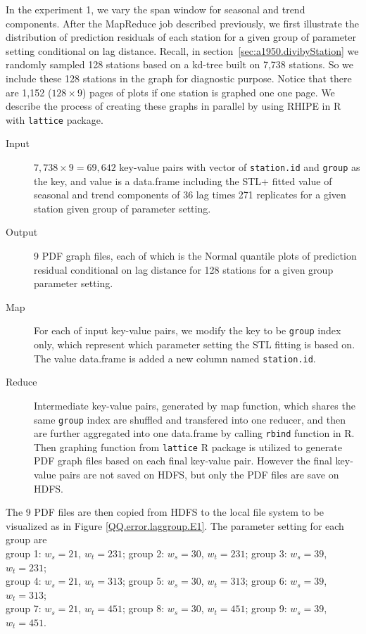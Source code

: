 In the experiment 1, we vary the span window for seasonal and trend components. 
After the MapReduce job described previously, we first illustrate the distribution
of prediction residuals of each station for a given group of parameter setting
conditional on lag distance. Recall, in section~\ref{sec:a1950.divibyStation} we
randomly sampled 128 stations based on a kd-tree built on 7,738 stations. So we 
include these 128 stations in the graph for diagnostic purpose. Notice that there
are 1,152 ($128 \times 9$) pages of plots if one station is graphed one one page.
We describe the process of creating these graphs in parallel by using RHIPE in R
with \texttt{lattice} package.

\begin{description}
  \item[Input] $7,738 \times 9 = 69,642$ key-value pairs with vector of 
  \texttt{station.id} and \texttt{group} as the key, and value is a data.frame
  including the STL+ fitted value of seasonal and trend components of 36 lag 
  times 271 replicates for a given station given group of parameter setting.
  \item[Output] 9 PDF graph files, each of which is the Normal quantile plots of
  prediction residual conditional on lag distance for 128 stations for a given
  group parameter setting.  
  \item[Map] For each of input key-value pairs, we modify the key to be 
  \texttt{group} index only, which represent which parameter setting the STL fitting
  is based on. The value data.frame is added a new column named \texttt{station.id}.
  \item[Reduce] Intermediate key-value pairs, generated by map function, which 
  shares the same \texttt{group} index are shuffled and transfered into one reducer,
  and then are further aggregated into one data.frame by calling \texttt{rbind} 
  function in R. Then graphing function from \texttt{lattice} R package is utilized
  to generate PDF graph files based on each final key-value pair. However the 
  final key-value pairs are not saved on HDFS, but only the PDF files are save on
  HDFS. 
\end{description} 

The 9 PDF files are then copied from HDFS to the local file system to be 
visualized as in Figure {\ref{QQ.error.laggroup.E1}}. The parameter setting for
each group are
\\
group 1: $w_s = 21$, $w_t = 231$;
group 2: $w_s = 30$, $w_t = 231$;
group 3: $w_s = 39$, $w_t = 231$;\\
group 4: $w_s = 21$, $w_t = 313$;
group 5: $w_s = 30$, $w_t = 313$;
group 6: $w_s = 39$, $w_t = 313$;\\
group 7: $w_s = 21$, $w_t = 451$;
group 8: $w_s = 30$, $w_t = 451$;
group 9: $w_s = 39$, $w_t = 451$.
\\

